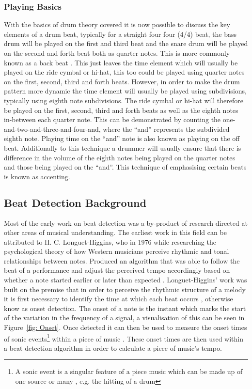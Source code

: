 \documentclass[a4paper, 11pt]{article}
\begin{document}
\subsubsection{Playing Basics}
With the basics of drum theory covered it is now possible to discuss the key elements of a drum beat, typically for a straight four four (4/4) beat, the bass drum will be played on the first and third beat and the snare drum will be played on the second and forth beat both as quarter notes. This is more commonly known as a back beat \cite{drum-bible}. This just leaves the time element which will usually be played on the ride cymbal or hi-hat, this too could be played using quarter notes on the first, second, third and forth beats. However, in order to make the drum pattern more dynamic the time element will usually be played using subdivisions, typically using eighth note subdivisions. The ride cymbal or hi-hat will therefore be played on the first, second, third and forth beats as well as the eighth notes in-between each quarter note. This can be demonstrated by counting the one-and-two-and-three-and-four-and, where the ``and'' represents the subdivided eighth note. Playing time on the ``and'' note is also known as playing on the off beat. Additionally to this technique a drummer will usually ensure that there is difference in the volume of the eighth notes being played on the quarter notes and those being played on the ``and''. This technique of emphasising certain beats is known as accenting. 


\subsection{Beat Detection Background}
Most of the early work on beat detection was a by-product of research directed at other areas of musical understanding. The earliest work in this field can be attributed to H. C. Longuet-Higgins, who in 1976 while researching the psychological theory of how Western musicians perceive rhythmic and tonal relationships between notes. Produced an algorithm that was able to follow the beat of a performance and adjust the perceived tempo accordingly based on whether a note started earlier or later than expected \cite{allen-danneburg}. Longuet-Higgins' work was built on the premise that in order to perceive the rhythmic structure of a melody it is first necessary to identify the time at which each beat occurs \cite{longeut1}, otherwise know as onset detection. The onset of a note is the instant which marks the start of the variation in the frequency of a signal, a visualisation of this can be seen in Figure~\ref{fig: Onset}. Once detected it can then be used to measure the onset times of sonic events\footnote{A sonic event is a singular feature of a piece music which can be made up of one source or many \cite{sonic}, e.g. the hitting of a drum} within a piece of music \cite{mirex-onset}. These onset times are then used within a beat detection algorithm in order to calculate a piece of music's tempo. 
\end{document}
